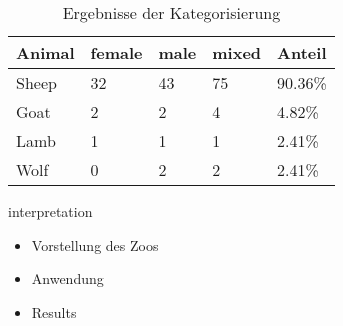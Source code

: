 \begin{table}[h]
	\centering
    \begin{tabular}{ | l | l | l | l | l |}
    \hline
    Animal & female & male & mixed & Anteil \\ \hline 
    Sheep 	& 32 	& 43	&	75	&	90.36\%	\\ \hline
    Goat	& 2		& 2		& 4 	&	4.82\% \\ \hline
    Lamb	& 1  	& 1		& 1		&	2.41\% \\ \hline
    Wolf	& 0  	& 2 	& 2		&	2.41\% \\ \hline
    \end{tabular}
    \caption{Ergebnisse der Kategorisierung}
   \label{table:resultsZoo}
\end{table}



interpretation


\begin{itemize}
	\item Vorstellung des Zoos
	\item Anwendung
	\item Results
\end{itemize}